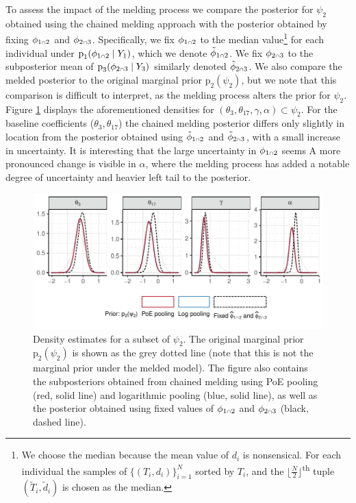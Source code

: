 \documentclass[
  10pt,
  a4paper,
]{article}
\let\Oldcap\cap
\renewcommand{\cap}{\mathrel{\mathsmaller{\Oldcap}}}
\newcommand{\pd}{\text{p}}
\begin{document}
To assess the impact of the melding process we compare the posterior for
\(\psi_{2}\) obtained using the chained melding approach with the
posterior obtained by fixing \(\phi_{1 \cap 2}\) and
\(\phi_{2 \cap 3}\). Specifically, we fix \(\phi_{1 \cap 2}\) to the
median value\footnote{We choose the median because the mean value of
  \(d_{i}\) is nonsensical. For each individual the samples of
  \(\{(T_{i}, d_{i})\}_{i = 1}^{N}\) sorted by \(T_{i}\), and the
  \(\lfloor \frac{N}{2}\rfloor\)\textsuperscript{th} tuple
  \((\tilde{T}_{i}, \tilde{d}_{i})\) is chosen as the median.} for each
individual under \(\pd_{1}(\phi_{1 \cap 2} \mid Y_{1})\), which we
denote \(\tilde{\phi}_{1 \cap 2}\). We fix \(\phi_{2 \cap 3}\) to the
subposterior mean of \(\pd_{3}(\phi_{2 \cap 3} \mid Y_{3})\) similarly
denoted \(\tilde{\phi}_{2 \cap 3}\). We also compare the melded
posterior to the original marginal prior \(\pd_{2}(\psi_{2})\), but we
note that this comparison is difficult to interpret, as the melding
process alters the prior for \(\psi_{2}\). Figure
\ref{fig:psi_2_comparision_plot} displays the aforementioned densities
for \((\theta_{3}, \theta_{17}, \gamma, \alpha) \subset \psi_{2}\). For
the baseline coefficients (\(\theta_{3}, \theta_{17}\)) the chained
melding posterior differs only slightly in location from the posterior
obtained using \(\tilde{\phi}_{1 \cap 2}\) and
\(\tilde{\phi}_{2 \cap 3}\), with a small increase in uncertainty. It is
interesting that the large uncertainty in \(\phi_{1 \cap 2}\) seems A
more pronounced change is visible in \(\alpha\), where the melding
process has added a notable degree of uncertainty and heavier left tail
to the posterior.

\begin{figure}

{\centering \includegraphics{../plots/mimic-example/psi-2-method-comparison-small} 

}

\caption{Density estimates for a subset of $\psi_{2}$. The original marginal prior $\pd_{2}(\psi_{2})$ is shown as the grey dotted line (note that this is not the marginal prior under the melded model). The figure also contains the subposteriors obtained from chained melding using PoE pooling (red, solid line) and logarithmic pooling (blue, solid line), as well as the posterior obtained using fixed values of $\phi_{1 \cap 2}$ and $\phi_{2 \cap 3}$ (black, dashed line).}\label{fig:psi_2_comparision_plot}
\end{figure}
\end{document}
